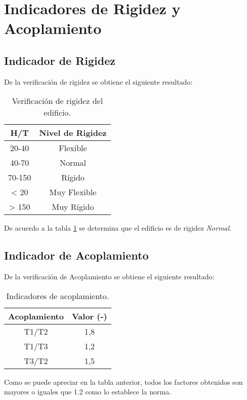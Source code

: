\newpage
\section{Indicadores de Rigidez y Acoplamiento}

    \subsection{Indicador de Rigidez}
        De la verificación de rigidez se obtiene el siguiente resultado:
        
        \begin{table}[H]
          \centering
          \caption{Verificación de rigidez del edificio.}
            \begin{tabular}{cc}
            \toprule
            \textbf{H/T}   & \textbf{Nivel de Rigidez} \\
            \midrule
            20-40 & Flexible \\
            40-70 & Normal \\
            70-150 & Rígido \\
            < 20  & Muy Flexible \\
            > 150 & Muy Rígido \\
            \bottomrule
            \end{tabular}%
          \label{rigidez}%
        \end{table}%
        
        De acuerdo a la tabla \ref{rigidez} se determina que el edificio es de rigidez \textit{Normal}.
        
    \subsection{Indicador de Acoplamiento}
    De la verificación de Acoplamiento se obtiene el siguiente resultado:
    
    \begin{table}[H]
  \centering
  \caption{Indicadores de acoplamiento.}
  \begin{tabular}{cc}
    \hline
    \textbf{Acoplamiento} &
      \textbf{Valor (-)}
      \bigstrut\\
    \hline
    T1/T2 &
      1,8
      \bigstrut[t]\\
    T1/T3 &
      1,2
      \\
    T3/T2 &
      1,5
      \bigstrut[b]\\
    \hline
  \end{tabular}
  \label{IndAcpl}
\end{table}

Como se puede apreciar en la tabla anterior, todos los factores obtenidos son mayores o iguales que 1.2 como lo establece la norma.